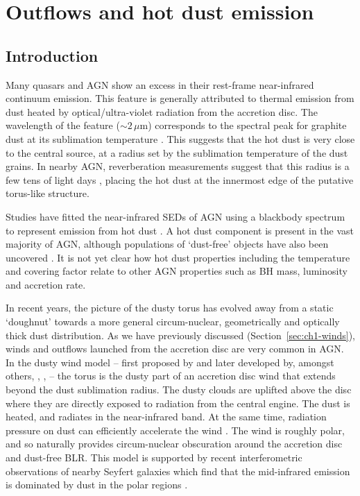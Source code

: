 
\chapter{Outflows and hot dust emission}
\label{ch:sed} 


\section{Introduction}

Many quasars and AGN show an excess in their rest-frame near-infrared continuum emission. 
This feature is generally attributed to thermal emission from dust heated by optical/ultra-violet radiation from the accretion disc. 
The wavelength of the feature ($\sim2$\,$\mu$m) corresponds to the spectral peak for graphite dust at its sublimation temperature \citep[$T\sim1500$\,K;][]{barvainis87}. 
This suggests that the hot dust is very close to the central source, at a radius set by the sublimation temperature of the dust grains.
In nearby AGN, reverberation measurements suggest that this radius is a few tens of light days \citep[e.g.][]{minezaki04,suganuma06}, placing the hot dust at the innermost edge of the putative torus-like structure.   

Studies have fitted the near-infrared SEDs of AGN using a blackbody spectrum to represent emission from hot dust \citep[e.g.][]{edelson86,barvainis87,kishimoto07,mor09,riffel09,deo11,landt11,mor11,roseboom13}. 
A hot dust component is present in the vast majority of AGN, although populations of `dust-free' objects have also been uncovered \citep{hao10,hao11,jiang10,mor11}. 
It is not yet clear how hot dust properties including the temperature and covering factor relate to other AGN properties such as BH mass, luminosity and accretion rate. 

In recent years, the picture of the dusty torus has evolved away from a static `doughnut' towards a more general circum-nuclear, geometrically and optically thick dust distribution. 
As we have previously discussed (Section~\ref{sec:ch1-winds}), winds and outflows launched from the accretion disc are very common in AGN. 
In the dusty wind model -- first proposed by \citet{konigl94} and later developed by, amongst others, \citet{everett05}, \citet{elitzur06}, \citet{keating12} -- the torus is the dusty part of an accretion disc wind that extends beyond the dust sublimation radius.  
The dusty clouds are uplifted above the disc where they are directly exposed to radiation from the central engine. 
The dust is heated, and radiates in the near-infrared band.
At the same time, radiation pressure on dust can efficiently accelerate the wind \citep[e.g.][]{fabian12}. 
The wind is roughly polar, and so naturally provides circum-nuclear obscuration around the accretion disc and dust-free BLR.   
This model is supported by recent interferometric observations of nearby Seyfert galaxies which find that the mid-infrared emission is dominated by dust in the polar regions \citep[e.g.][]{raban09,honig12,honig13,tristram14,lopez-gonzaga16}.

